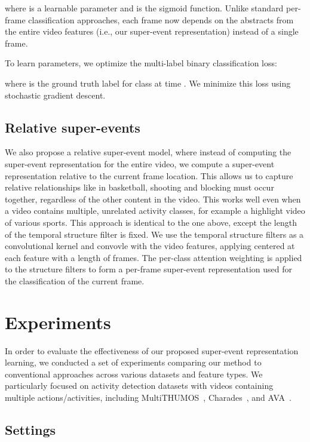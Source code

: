 \documentclass[10pt,twocolumn,letterpaper]{article}
\begin{document}
where  is a learnable parameter and  is the sigmoid function. Unlike standard per-frame classification approaches, each frame now depends on the abstracts from the entire video features (i.e., our super-event representation) instead of a single frame.

To learn parameters, we optimize the multi-label binary classification loss:

where  is the ground truth label for class  at time . We minimize this loss using stochastic gradient descent.

\subsection{Relative super-events}
We also propose a relative super-event model, where instead of computing the super-event representation for the entire video, we compute a super-event representation relative to the current frame location. This allows us to capture relative relationships like in basketball, shooting and blocking must occur together, regardless of the other content in the video. This works well even when a video contains multiple, unrelated activity classes, for example a highlight video of various sports.
This approach is identical to the one above, except the length  of the temporal structure filter is fixed. We use the temporal structure filters  as a convolutional kernel and convovle with the video features, applying  centered at each feature  with a length of  frames. The per-class attention weighting is applied to the structure filters to form a per-frame super-event representation used for the classification of the current frame.



\section{Experiments}
In order to evaluate the effectiveness of our proposed super-event representation learning, we conducted a set of experiments comparing our method to conventional approaches across various datasets and feature types. We particularly focused on activity detection datasets with videos containing multiple actions/activities, including MultiTHUMOS~\cite{yeung2015every}, Charades~\cite{sigurdsson2016hollywood}, and AVA~\cite{ava2017}.

\subsection{Settings}
\end{document}
